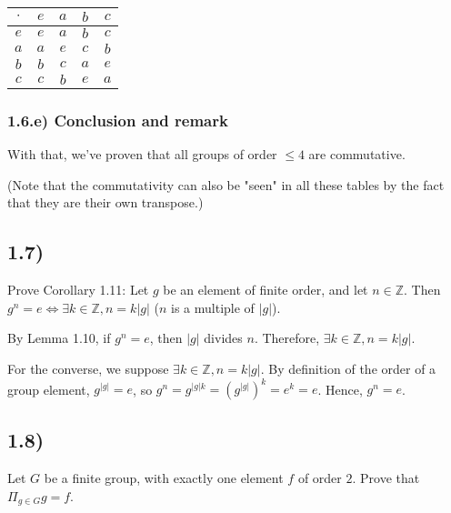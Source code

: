 \begin{tabular}{|c||c|c|c|c|}
\hline
$\cdot$ & $e$ & $a$ & $b$ & $c$ \\ \hline \hline
$e    $ & $e$ & $a$ & $b$ & $c$ \\ \hline
$a    $ & $a$ & $e$ & $c$ & $b$ \\ \hline
$b    $ & $b$ & $c$ & $a$ & $e$ \\ \hline
$c    $ & $c$ & $b$ & $e$ & $a$ \\ \hline
\end{tabular}


\subsubsection*{1.6.e) Conclusion and remark}

With that, we've proven that all groups of order $\leq 4$ are commutative.

(Note that the commutativity can also be "seen" in all these tables by the fact that they are their own transpose.)



\subsection*{1.7)}

Prove Corollary 1.11: Let $g$ be an element of finite order, and let $n \in \mathbb{Z}$. Then $g^n = e \Leftrightarrow \exists k \in \mathbb{Z}, n = k|g|$ ($n$ is a multiple of $|g|$).

By Lemma 1.10, if $g^n = e$, then $|g|$ divides $n$. Therefore, $\exists k \in \mathbb{Z}, n = k|g|$.

For the converse, we suppose $\exists k \in \mathbb{Z}, n = k|g|$. By definition of the order of a group element, $g^{|g|} = e$, so $g^n = g^{|g|k} = (g^{|g|})^k = e^k = e$. Hence, $g^n = e$.



\subsection*{1.8)}


Let $G$ be a finite group, with exactly one element $f$ of order $2$. Prove that $\Pi_{g \in G} g = f$.


